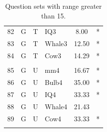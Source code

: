 \documentclass[12pt,nohyper]{tufte-handout}\usepackage[]{graphicx}\usepackage[]{color}
\begin{document}
\begin{longtable}{ccclcl}
   82 & G & T & IQ3 & 8.00 & * \\ 
   83 & G & T & Whale3 & 12.50 & * \\ 
   84 & G & T & Cow3 & 14.29 & * \\ 
   &  &  &  &  &  \\ 
   85 & G & U & mm4 & 16.67 & * \\ 
   86 & G & U & Bulb4 & 35.00 & * \\ 
   87 & G & U & IQ4 & 33.33 & * \\ 
   88 & G & U & Whale4 & 21.43 &  \\ 
   89 & G & U & Cow4 & 33.33 & * \\ 
   \hline
\hline
\caption{Question sets with range greater than 15.} 
\label{tab:summary_question}
\end{longtable}
\end{document}
